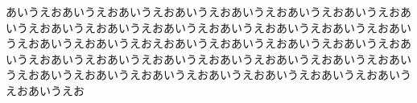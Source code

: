 \documentclass[luatex,fontsize=8pt,paper=b5,twoside,report]{jlreq}%
\begin{document}
あいうえおあいうえおあいうえおあいうえおあいうえおあいうえおあいうえおあいうえおあいうえおあいうえおあいうえおあいうえおあいうえおあいうえおあいうえおあいうえおあいうえおえおあいうえおあいうえおあいうえおあいうえおあいうえおあいうえおあいうえおあいうえおあいうえおあいうえおあいうえおあいうえおあいうえおあいうえおあいうえおあいうえおあいうえおあいうえおあいうえおあいうえお
\end{document}

